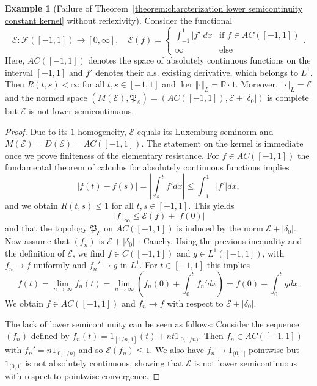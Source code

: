\documentclass[a4paper,11pt,reqno]{amsart}
\theoremstyle{definition}
\newtheorem{example}[lemma]{Example}
\numberwithin{equation}{section}
\newcommand{\cE}{{\mathcal E}}
\newcommand{\cF}{{\mathcal F}}
\newcommand{\R}{{\mathbb R}}
\newcommand{\av}[1]{\left\Vert #1\right\Vert}
\newcommand{\1}{\mathds{1}}
\begin{document}
\begin{example}[Failure of Theorem~\ref{theorem:charcterization lower semicontinuity constant kernel} without reflexivity] \label{example:failure of equivalence}
 Consider the functional 
 $$\cE \colon \cF([-1,1]) \to [0,\infty], \quad \cE(f) = \begin{cases}
                                                          \int_{-1}^1 |f'| dx &\text{if } f  \in AC([-1,1])\\
                                                          \infty &\text{else}
                                                         \end{cases}.
$$
%
Here, $AC([-1,1])$ denotes the space of absolutely continuous functions on the interval $[-1,1]$  and $f'$ denotes their a.s. existing derivative, which belongs to $L^1$. Then    $R(t,s) < \infty$ for all $t,s \in [-1,1]$ and $\ker \av{\cdot}_L = \R \cdot 1$. Moreover, $\av{\cdot}_L = \cE$ and  the normed space $(M(\cE),\mathfrak{P}_\cE) = (AC([-1,1]),\cE + |\delta_0|)$ is complete but $\cE$ is not lower semicontinuous.
\end{example}

\begin{proof} Due to its $1$-homogeneity, $\cE$ equals its Luxemburg seminorm and $M(\cE) = D(\cE) = AC([-1,1])$. The statement on the kernel is immediate once we prove finiteness of the elementary resistance.  For   $f \in AC([-1,1])$ the fundamental theorem of calculus for absolutely continuous functions implies 
%
$$|f(t) - f(s)| = \left|\int_s^t f' dx  \right|\leq \int_{-1}^1 |f'| dx, $$
%
and we obtain $R(t,s) \leq 1$ for all $t,s \in [-1,1]$.   This yields 
%
$$\av{f}_\infty \leq \cE(f) + |f(0)|$$
%
and that the topology $\mathfrak{P}_\cE$ on $AC([-1,1])$ is induced by the norm $\cE + |\delta_0|$. Now assume that $(f_n)$ is  $\cE + |\delta_0|$ - Cauchy. Using the previous inequality and the definition of $\cE$, we find $f \in C([-1,1])$ and $g \in L^1([-1,1])$, with $f_n \to f$ uniformly and $f_n' \to g$ in $L^1$. For $t \in [-1,1]$ this implies 
%
$$f(t) = \lim_{n \to \infty} f_n(t) = \lim_{n \to \infty} \left(f_n(0) + \int_0^t f_n' dx \right) = f(0) + \int_0^t g dx.$$
%
We obtain $f \in AC([-1,1])$ and $f_n \to f$ with respect to $\cE + |\delta_0|$. 

The lack of lower semicontinuity can be seen as follows: Consider the sequence $(f_n)$ defined by $f_n(t) = 1_{[1/n,1]}(t) + nt 1_{[0,1/n)}$. Then $f_n \in AC([-1,1])$ with $f_n' = n  1_{[0,1/n)}$ and so $\cE(f_n) \leq 1$. We also have $f_n \to 1_{(0,1]}$ pointwise but $1_{(0,1]}$ is not absolutely continuous, showing that $\cE$ is not lower semicontinuous with respect to pointwise convergence.
\end{proof}
\end{document}
